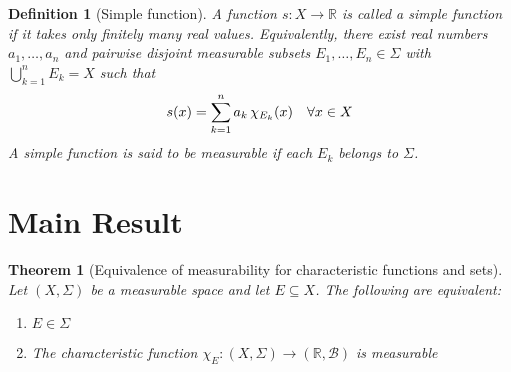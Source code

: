 \documentclass{article}
\newcommand{\tmem}[1]{{\em #1\/}}
\newtheorem{definition}{Definition}
{\theorembodyfont{\rmfamily}\newtheorem{remark}{Remark}}
\newtheorem{theorem}{Theorem}
\newcommand{\R}{\mathbb{R}}
\newcommand{\B}{\mathcal{B}}
\newcommand{\Sig}{\Sigma}
\begin{document}
\begin{definition}
  [Simple function] A function $s : X \to \R$ is called a {\tmem{simple
  function}} if it takes only finitely many real values. Equivalently, there
  exist real numbers $a_1, \ldots, a_n$ and pairwise disjoint measurable
  subsets $E_1, \ldots, E_n \in \Sig$ with $\bigcup_{k = 1}^n E_k = X$ such
  that
  \begin{equation}
    s (x) = \sum_{k = 1}^n a_k  \hspace{0.17em} \chi_{E_k} (x)  \quad \text{}
    \forall x \in X
  \end{equation}
  A simple function is said to be {\tmem{measurable}} if each $E_k$ belongs to
  $\Sig$.
\end{definition}

\section*{Main Result}

\begin{theorem}
  [Equivalence of measurability for characteristic functions and sets] Let
  $(X, \Sig)$ be a measurable space and let $E \subseteq X$. The following are
  equivalent:
  \begin{enumerate}
    \item $E \in \Sig$
    
    \item The characteristic function $\chi_E : (X, \Sig) \to (\R, \B)$ is
    measurable
  \end{enumerate}
\end{theorem}
\end{document}
